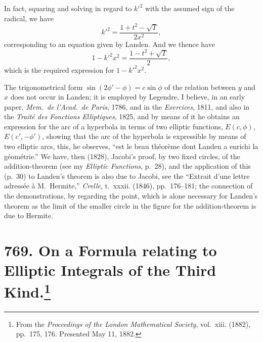 \documentclass[11pt,a4paper]{book}
\begin{document}
In fact, squaring and solving in regard to $k'^2$ with the assumed sign of the radical, we have
\[
k'^2 = \frac{1 + t^2 - \sqrt{T}}{2x^2},
\]
corresponding to an equation given by Landen. And we thence have
\[
1 - k'^2x^2 = \frac{1 - t^2 + \sqrt{T}}{2},
\]
which is the required expression for $1 - k'^2x^2$.

The trigonometrical form $\sin(2\phi' - \phi) = c\sin\phi$ of the relation between $y$ and $x$ does not occur in Landen; it is employed by Legendre, I believe, in an early paper, \textit{Mem.~de l'Acad.~de Paris}, 1786, and in the \textit{Exercices}, 1811, and also in the \textit{Trait\'e des Fonctions Elliptiques}, 1825, and by means of it he obtains an expression for the arc of a hyperbola in terms of two elliptic functions, $E(c, \phi)$, $E(c', -\phi')$, showing that the arc of the hyperbola is expressible by means of two elliptic arcs, this, he observes, ``est le beau th\'eor\`eme dont Landen a enrichi la g\'eom\'etrie.'' We have, then (1828), Jacobi's proof, by two fixed circles, of the addition-theorem (see my \textit{Elliptic Functions}, p.~28), and the application of this (p.~30) to Landen's theorem is also due to Jacobi, see the ``Extrait d'une lettre adress\'ee \`a M.~Hermite,'' \textit{Crelle}, t.~xxxii. (1846), pp.~176--181; the connection of the demonstrations, by regarding the point, which is alone necessary for Landen's theorem as the limit of the smaller circle in the figure for the addition-theorem is due to Hermite.

\newpage
\section[On a Formula relating to Elliptic Integrals of the Third Kind]{769. On a Formula relating to Elliptic Integrals of the Third Kind.\footnote{From the \textit{Proceedings of the London Mathematical Society}, vol.~xiii. (1882), pp.~175, 176. Presented May 11, 1882.}}
\end{document}
